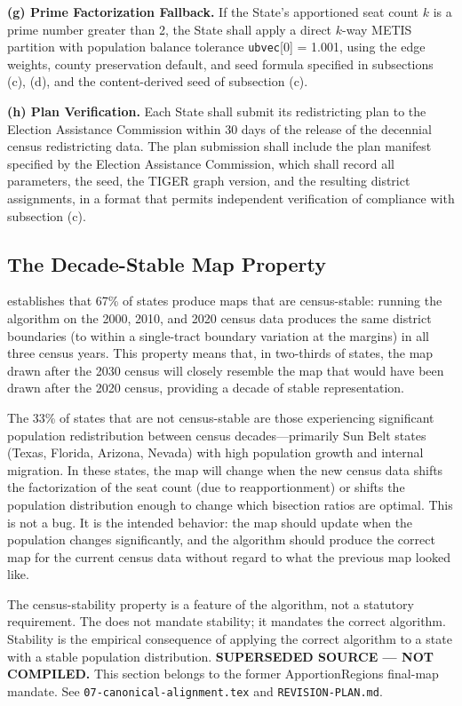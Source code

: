 \begin{statute}
\medskip
\noindent\textbf{(g) Prime Factorization Fallback.}
If the State's apportioned seat count $k$ is a prime number greater than 2,
the State shall apply a direct $k$-way METIS partition with population balance
tolerance \texttt{ubvec}[0] = 1.001, using the edge weights, county preservation
default, and seed formula specified in subsections (c), (d), and the
content-derived seed of subsection (c).

\medskip
\noindent\textbf{(h) Plan Verification.}
Each State shall submit its redistricting plan to the Election Assistance
Commission within 30 days of the release of the decennial census redistricting
data.
The plan submission shall include the plan manifest specified by the Election
Assistance Commission, which shall record all parameters, the seed, the TIGER
graph version, and the resulting district assignments, in a format that permits
independent verification of compliance with subsection (c).
\end{statute}

\subsection{The Decade-Stable Map Property}

\citet{b15paper} establishes that 67\% of states produce \ar{} maps that are
census-stable: running the algorithm on the 2000, 2010, and 2020 census data
produces the same district boundaries (to within a single-tract boundary
variation at the margins) in all three census years.
This property means that, in two-thirds of states, the map drawn after the
2030 census will closely resemble the map that would have been drawn after
the 2020 census, providing a decade of stable representation.

The 33\% of states that are not census-stable are those experiencing
significant population redistribution between census decades---primarily
Sun Belt states (Texas, Florida, Arizona, Nevada) with high population
growth and internal migration.
In these states, the \dia{} map will change when the new census data shifts
the factorization of the seat count (due to reapportionment) or shifts the
population distribution enough to change which bisection ratios are optimal.
This is not a bug.
It is the intended behavior: the map should update when the population changes
significantly, and the algorithm should produce the correct map for the
current census data without regard to what the previous map looked like.

The census-stability property is a feature of the algorithm, not a statutory
requirement.
The \dia{} does not mandate stability; it mandates the correct algorithm.
Stability is the empirical consequence of applying the correct algorithm
to a state with a stable population distribution.
\noindent\textbf{SUPERSEDED SOURCE --- NOT COMPILED.} This section belongs to
the former ApportionRegions final-map mandate. See
\texttt{07-canonical-alignment.tex} and \texttt{REVISION-PLAN.md}.
